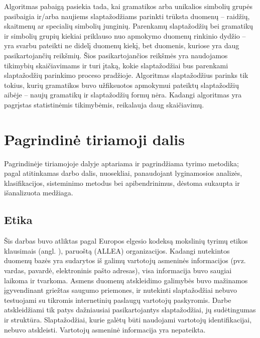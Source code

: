 \documentclass{VUMIFInfBakalaurinis}
\begin{document}
Algoritmas pabaigą pasiekia tada, kai gramatikos arba unikalios simbolių grupės 
pasibaigia ir/arba naujiems slaptažodžiams parinkti trūksta duomenų -- raidžių, 
skaitmenų ar specialių simbolių junginių. Parenkamų slaptažodžių bei gramatikų 
ir simbolių grupių kiekiai priklauso nuo apmokymo duomenų rinkinio dydžio -- yra 
svarbu pateikti ne didelį duomenų kiekį, bet duomenis, kuriose yra daug 
pasikartojančių reikšmių. Šios pasikartojančios reikšmės yra naudojamos 
tikimybių skaičiavimams ir turi įtaką, kokie slaptažodžiai bus parenkami 
slaptažodžių parinkimo proceso pradžioje.
Algoritmas slaptažodžius parinks tik tokius, kurių gramatikos buvo užfiksuotos 
apmokymui pateiktų slaptažodžių aibėje -- naujų gramatikų ir slaptažodžių formų 
nėra.
Kadangi  algoritmas yra pagrįstas statistinėmis tikimybėmis, 
reikalauja daug skaičiavimų.



\section{Pagrindinė tiriamoji dalis}
Pagrindinėje tiriamojoje dalyje aptariama ir pagrindžiama tyrimo metodika;
pagal atitinkamas darbo dalis, nuosekliai, panaudojant lyginamosios analizės,
klasifikacijos, sisteminimo metodus bei apibendrinimus, dėstoma sukaupta ir
išanalizuota medžiaga. 

\subsection{Etika}
Šis darbas buvo atliktas pagal Europos elgesio kodeksą mokslinių tyrimų etikos 
klausimais
(angl. ), paruoštą 
 (ALLEA) 
organizacijos. Kadangi nutekintos duomenų bazės yra sudarytos iš galimų 
vartotojų asmeninės informacijos (pvz. vardas, pavardė, elektroninis pašto 
adresas), visa informacija buvo saugiai laikoma ir tvarkoma. Asmens duomenų 
atskleidimo galimybės buvo mažinamos įgyvendinant griežtas saugumo priemones, ir 
nutekinti slaptažodžiai nebuvo testuojami su tikromis internetinių paslaugų 
vartotojų paskyromis. Darbe atskleidžiami tik patys dažniausiai pasikartojantys 
slaptažodžiai, jų sudėtingumas ir struktūra. Slaptažodžiai, kurie galėtų būti 
naudojami vartotojų identifikacijai, nebuvo atskleisti. Vartotojų asmeninė 
informacija yra nepateikta.
\end{document}
